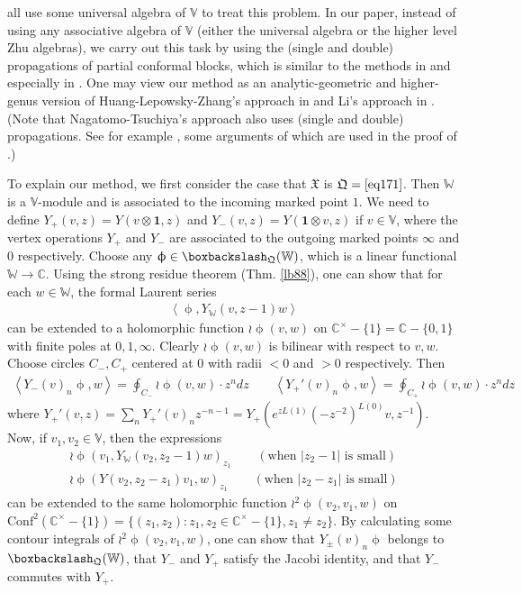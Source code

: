 \documentclass[11pt,b5paper,notitlepage]{article}
\theoremstyle{definition}
\theoremstyle{plain}
\newcommand{\fk}{\mathfrak}
\newcommand{\idt}{\mathbf{1}}
\newcommand{\Conf}{\mathrm{Conf}}
\newcommand{\Vbb}{\mathbb V}
\newcommand{\Wbb}{\mathbb W}
\newcommand{\Cbb}{\mathbb C}
\newcommand{\<}{\left\langle}
\renewcommand{\>}{\right\rangle}
\newcommand{\fx}{\mathfrak{X}}
\newcommand{\bbs}{\boxbackslash}
\newcommand{\fq}{{\mathfrak Q}}
\numberwithin{equation}{section}
\begin{document}
\cite{NT-P1_conformal_blocks,DGT2,KZ-conformal-block} all use some universal algebra of $\Vbb$ to treat this problem. In our paper, instead of using any associative algebra of $\Vbb$ (either the universal algebra or the higher level Zhu algebras), we carry out this task by using the (single and double) propagations of partial conformal blocks, which is similar to the methods in \cite{Zhu-global} and especially in \cite{Gui-propagation}. One may view our method as an analytic-geometric and higher-genus version of Huang-Lepowsky-Zhang's approach in \cite{HLZ4} and Li's approach in \cite{Li-regular-rep}. (Note that Nagatomo-Tsuchiya's approach also uses (single and double) propagations. See for example  \cite[Sec. 5.5]{NT-P1_conformal_blocks}, some arguments of which are used in the proof of \cite[Prop. 7.7.2.]{NT-P1_conformal_blocks}.) %


To explain our method, we first consider the case that $\fk X$ is $\fq=\eqref{eq171}$. Then $\Wbb$ is a $\Vbb$-module and is associated to the incoming marked point $1$. We need to define $Y_+(v,z)=Y(v\otimes \idt,z)$ and $Y_-(v,z)=Y(\idt\otimes v,z)$ if $v\in\Vbb$, where the vertex operations $Y_+$ and $Y_-$ are associated to the outgoing marked points $\infty$ and $0$ respectively. Choose any $\upphi\in\bbs_\fq(\Wbb)$, which is a linear functional $\Wbb\rightarrow\Cbb$. Using the strong residue theorem (Thm. \ref{lb88}), one can show that for each $w\in\Wbb$, the formal Laurent series
\begin{align}
\<\upphi, Y_\Wbb(v,z-1)w\> \label{eq172}
\end{align}
can be extended to a holomorphic function $\wr\upphi(v,w)$ on $\Cbb^\times-\{1\}=\Cbb-\{0,1\}$ with finite poles at $0,1,\infty$. Clearly $\wr\upphi(v,w)$ is bilinear with respect to $v,w$. Choose circles $C_-,C_+$ centered at $0$ with radii $<0$ and $>0$ respectively. Then
\begin{gather*}
\<Y_-(v)_n\upphi,w\>=\oint_{C_-}\wr\upphi(v,w)\cdot z^ndz\qquad
\<Y_+'(v)_n\upphi,w\>=\oint_{C_+}\wr\upphi(v,w)\cdot z^ndz
\end{gather*}
where $Y_+'(v,z)=\sum_n Y_+'(v)_nz^{-n-1}=Y_+(e^{zL(1)}(-z^{-2})^{L(0)}v,z^{-1})$. Now, if $v_1,v_2\in\Vbb$, then the expressions
\begin{subequations}\label{eq173}
\begin{gather}
\wr\upphi(v_1,Y_\Wbb(v_2,z_2-1)w)_{z_1}\qquad (\text{when }|z_2-1|\text{ is small})\\
\wr\upphi(Y(v_2,z_2-z_1)v_1,w)_{z_1}\qquad (\text{when }|z_2-z_1|\text{ is small})
\end{gather}
\end{subequations}
can be extended to the same holomorphic function $\wr^2\upphi(v_2,v_1,w)$ on $\Conf^2(\Cbb^\times-\{1\})=\{(z_1,z_2):z_1,z_2\in\Cbb^\times-\{1\},z_1\neq z_2\}$. By calculating some contour integrals of $\wr^2\upphi(v_2,v_1,w)$, one can show that $Y_\pm(v)_n\upphi$ belongs to $\bbs_\fq(\Wbb)$, that $Y_-$ and $Y_+$ satisfy the Jacobi identity, and that $Y_-$ commutes with $Y_+$.
\end{document}
